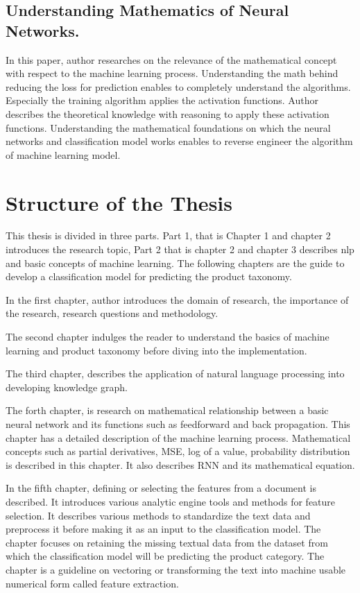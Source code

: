\subsection{Understanding Mathematics of Neural Networks.}

In this paper, author researches on the relevance of the mathematical concept with respect to the machine learning process. Understanding the math behind reducing the loss for prediction enables to completely understand the algorithms. Especially the training algorithm applies the activation functions. Author describes the theoretical knowledge with reasoning to apply these activation functions. Understanding the mathematical foundations on which the neural networks and classification model works enables to reverse engineer the algorithm of machine learning model.

\clearpage

\section{Structure of the Thesis}
This thesis is divided in three parts. Part 1, that is   Chapter 1 and chapter 2 introduces the research topic, Part 2 that is chapter 2 and chapter 3 describes \acl{nlp} and basic concepts of machine learning. The following chapters are the guide to develop a classification model for predicting the product taxonomy.

In the first chapter, author introduces the domain of research, the importance of the research, research questions and methodology.

The second chapter indulges the reader to understand the basics of machine learning and product taxonomy before diving into the implementation.

The third chapter, describes the application of natural language processing into developing knowledge graph.

The forth chapter, is research on mathematical relationship between a basic neural network and its functions such as feedforward and back propagation. This chapter has a detailed description of the machine learning process. Mathematical concepts such as partial derivatives, \acl{MSE}, log of a value, probability distribution is described in this chapter. It also describes \acl{RNN} and its mathematical equation. 

In the fifth chapter, defining or selecting the features from a document is described. It introduces various analytic engine tools and methods for feature selection. It describes various methods to standardize the text data and preprocess it before making it as an input to the classification model. The chapter focuses on retaining the missing textual data from the dataset from which the classification model will be predicting the product category. The chapter is a guideline on vectoring or transforming the text into machine usable numerical form called feature extraction.

